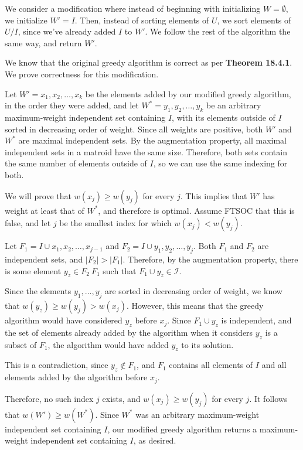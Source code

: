 \documentclass[11pt]{article}
\newcommand{\union}{\cup}
\begin{document}
\begin{enumerate}
We consider a modification where instead of beginning with initializing $W = \emptyset$, we initialize $W' = I$. 
Then, instead of sorting elements of $U$, we sort elements of $U / I$, since we've already added $I$ to $W'$. 
We follow the rest of the algorithm the same way, and return $W'$.

We know that the original greedy algorithm is correct as per \textbf{Theorem 18.4.1}. We prove correctness for this modification. 

Let $W' = {x_1, x_2, \dots, x_k}$ be the elements added by our modified greedy algorithm, in the order they were added, and let 
$W^* = {y_1, y_2, \dots, y_k}$ be an arbitrary maximum-weight independent set containing $I$, with its elements outside of $I$ 
sorted in decreasing order of weight. Since all weights are positive, both $W'$ and $W^*$ are maximal independent sets. 
By the augmentation property, all maximal independent sets in a matroid have the same size.  
Therefore, both sets contain the same number of elements outside of $I$, so we can use the same indexing for both. 

We will prove that $w(x_j) \geq w(y_j)$ for every $j$. This implies that $W'$ has weight at least that of $W^*$, and therefore is optimal. 
Assume FTSOC that this is false, and let $j$ be the smallest index for which $w(x_j) < w(y_j)$.

Let $F_1 = I \union {x_1, x_2, \dots, x_{j-1}}$ and $F_2 = I \union {y_1, y_2, \dots, y_j}$. Both $F_1$ and $F_2$ are independent sets, and $|F_2|>|F_1|$. 
Therefore, by the augmentation property, there is some element $y_z \in F_2 \ F_1$
such that $F_1 \union {y_z} \in \mathcal I$.

Since the elements $y_1,\dots,y_j$ are sorted in decreasing order of weight, we know that $w(y_z) \geq w(y_j) > w(x_j)$. 
However, this means that the greedy algorithm would have considered $y_z$ before $x_j$. Since $F_1 \union {y_z}$ is independent, 
and the set of elements already added by the algorithm when it considers $y_z$ is a subset of $F_1$, the algorithm would have added $y_z$ to its solution. 

This is a contradiction, since $y_z \notin F_1$, and $F_1$ contains all elements of $I$ and all elements added by the algorithm before $x_j$.

Therefore, no such index $j$ exists, and $w(x_j) \geq w(y_j)$ for every $j$. It follows that $w(W') \geq w(W^*)$.
Since $W^*$ was an arbitrary maximum-weight independent set containing $I$, 
our modified greedy algorithm returns a maximum-weight independent set containing $I$, as desired.

\end{enumerate}
\end{document}
